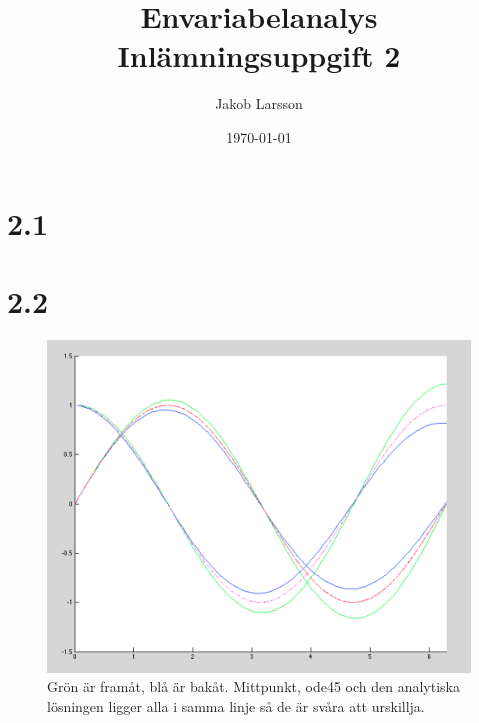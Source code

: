 \documentclass[a4paper,10pt]{article}
\begin{document}
    \title{Envariabelanalys \\ Inlämningsuppgift 2}
    \date{\today}
    \author{Jakob Larsson}
    \maketitle

    \section*{2.1}

    \begin{samepage}
    \end{samepage}
    \begin{samepage}
    \end{samepage}
    \begin{samepage}
    \end{samepage}

    \section*{2.2}
    \begin{samepage}
    \end{samepage}
    \begin{samepage}
    \end{samepage}

    \begin{figure}
        \includegraphics[width=\textwidth]{svang.png}
        \caption{Grön är framåt, blå är bakåt.
            Mittpunkt, ode45 och den analytiska lösningen ligger alla i samma
            linje så de är svåra att urskillja.}
    \end{figure}
\end{document}
